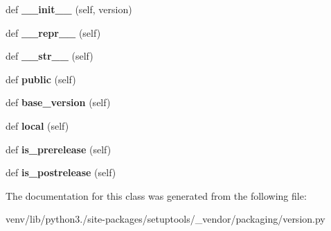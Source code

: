 \begin{DoxyCompactItemize}
\item 
\mbox{\label{classsetuptools_1_1__vendor_1_1packaging_1_1version_1_1_version_ae8b2f8a830a6cf19c684030ff92c4671}} 
def {\bfseries \+\_\+\+\_\+init\+\_\+\+\_\+} (self, version)
\item 
\mbox{\label{classsetuptools_1_1__vendor_1_1packaging_1_1version_1_1_version_a0d9472677e5b73b6603a86adee3b0eec}} 
def {\bfseries \+\_\+\+\_\+repr\+\_\+\+\_\+} (self)
\item 
\mbox{\label{classsetuptools_1_1__vendor_1_1packaging_1_1version_1_1_version_ad7799d4b1432a9a0ec3f8569b61e94a1}} 
def {\bfseries \+\_\+\+\_\+str\+\_\+\+\_\+} (self)
\item 
\mbox{\label{classsetuptools_1_1__vendor_1_1packaging_1_1version_1_1_version_a578277f9d083813e22b4c9b898d32fa1}} 
def {\bfseries public} (self)
\item 
\mbox{\label{classsetuptools_1_1__vendor_1_1packaging_1_1version_1_1_version_aa746c3c630ce6203fc91699975827ecd}} 
def {\bfseries base\+\_\+version} (self)
\item 
\mbox{\label{classsetuptools_1_1__vendor_1_1packaging_1_1version_1_1_version_a1ca67c2cc35de1bf61b9e419f779c927}} 
def {\bfseries local} (self)
\item 
\mbox{\label{classsetuptools_1_1__vendor_1_1packaging_1_1version_1_1_version_a86b6508470c8795b9dbc3951b4fd9390}} 
def {\bfseries is\+\_\+prerelease} (self)
\item 
\mbox{\label{classsetuptools_1_1__vendor_1_1packaging_1_1version_1_1_version_a473df1b65542159470e42b342de3f123}} 
def {\bfseries is\+\_\+postrelease} (self)
\end{DoxyCompactItemize}


The documentation for this class was generated from the following file\+:\begin{DoxyCompactItemize}
\item 
venv/lib/python3./site-\/packages/setuptools/\+\_\+vendor/packaging/version.\+py\end{DoxyCompactItemize}
